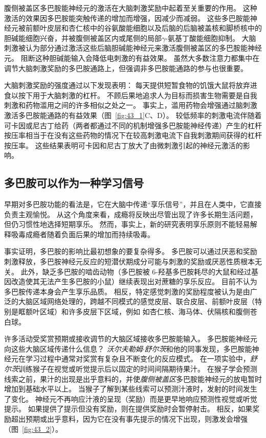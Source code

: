 腹侧被盖区多巴胺能神经元的激活在大脑刺激奖励中起着至关重要的作用。
这种激活的效果因多巴胺能突触传递的增加而增强，因减少而减弱。
这些多巴胺能神经元被前额叶皮层和杏仁核中的谷氨酸能细胞以及后脑的后脑被盖核和脚桥核中的胆碱能细胞兴奋，并被腹侧被盖区内或尾侧的局部$\gamma$-氨基丁酸能细胞抑制。
大脑刺激被认为部分通过激活这些后脑胆碱能神经元来激活腹侧被盖区的多巴胺能神经元。
阻断这种胆碱能输入会降低电刺激的有益效果。
虽然大多数注意力都集中在调节大脑刺激奖励的多巴胺通路上，但强调非多巴胺能通路的参与也很重要。


大脑刺激奖励的强度通过以下发现表明：
每天提供短暂食物的饥饿大鼠将放弃进食以按下用于大脑刺激的杠杆。
不顾后果地追求人为目标而损害生物需要是自我刺激和药物滥用之间的许多相似之处之一。
事实上，滥用药物会增强通过脑刺激激活多巴胺能通路的有益效果（图~\ref{fig:43_1}C、D）。
较低频率的刺激电流伴随着可卡因或尼古丁给药（两者都通过不同的机制增强多巴胺能神经传递）产生的杠杆按压率相当于在没有这些药物的情况下在较高刺激电流下自我刺激期间获得的杠杆按压率。
这些结果表明可卡因和尼古丁放大了由微刺激引起的神经元激活的影响。



\subsection{多巴胺可以作为一种学习信号}

早期对多巴胺功能的看法是，它在大脑中传递“享乐信号”，并且在人类中，它直接负责主观愉悦。
从这个角度来看，成瘾将反映出尽管出现了许多长期生活问题，但仍习惯性地选择短期享乐。
然而，事实上，新的研究表明享乐原则不能轻易解释吸毒成瘾者随着负面后果的增加而持续吸毒。


事实证明，多巴胺的影响比最初想象的要复杂得多。
多巴胺可以通过厌恶和奖励刺激释放，多巴胺神经元反应的短潜伏期成分可能与刺激的奖励或厌恶性质根本无关。
此外，缺乏多巴胺的啮齿动物（多巴胺被 6-羟基多巴胺耗尽的大鼠和经过基因改造使其无法产生多巴胺的小鼠）继续表现出对蔗糖的享乐反应。
目前不认为多巴胺传递本身会产生享乐品质。
相反，特定感觉刺激的奖励程度被认为是由广泛的大脑区域网络处理的，跨越不同模式的感觉皮层、联合皮层、前额叶皮层（特别是眶额叶区域）和许多皮层下区域，例如 如杏仁核、海马体、伏隔核和腹侧苍白球。


许多活动受奖赏预期或接收调节的大脑区域接收多巴胺能输入。
多巴胺能神经元向这些大脑区域传递什么信息？
\textit{沃尔夫勒姆$\cdot$舒尔茨}和他的同事发现，多巴胺能神经元在学习过程中通常对奖赏有复杂且不断变化的反应模式。
在一项实验中，\textit{舒尔茨}训练猴子在视觉或听觉提示后以固定的时间间隔期待果汁。
在猴子学会预测线索之前，果汁的出现是出乎意料的，并使\textit{腹侧被盖区}多巴胺能神经元的放电暂时增加到基础水平以上。
当猴子了解到某些线索可以预测汁液时，发射的时间发生了变化。
神经元不再响应汁液的呈现（奖励）而是更早地响应预测性视觉或听觉提示。
如果提供了提示但没有奖励，则在提供奖励时会暂停射击。
相反，如果奖励超出预期或出乎意料，因为它在没有事先提示的情况下出现，则激发会增强（图~\ref{fig:43_2}）。


